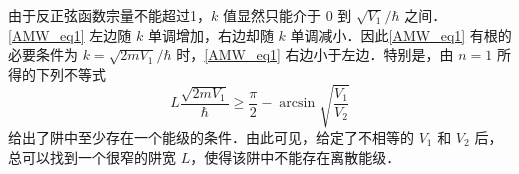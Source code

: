 由于反正弦函数宗量不能超过1，$k$ 值显然只能介于 $0$ 到 $\sqrt{V_1}/\hbar$ 之间．\autoref{AMW_eq1} 左边随 $k$ 单调增加，右边却随 $k$ 单调减小．因此\autoref{AMW_eq1} 有根的必要条件为 $k=\sqrt{2mV_1}/\hbar$ 时，\autoref{AMW_eq1} 右边小于左边．特别是，由 $n=1$ 所得的下列不等式
\begin{equation}
L\frac{\sqrt{2mV_1}}{\hbar}\geq\frac{\pi}{2}-\arcsin\sqrt{\frac{V_1}{V_2}}
\end{equation}
给出了阱中至少存在一个能级的条件．由此可见，给定了不相等的 $V_1$ 和 $V_2$ 后，总可以找到一个很窄的阱宽 $L$，使得该阱中不能存在离散能级．